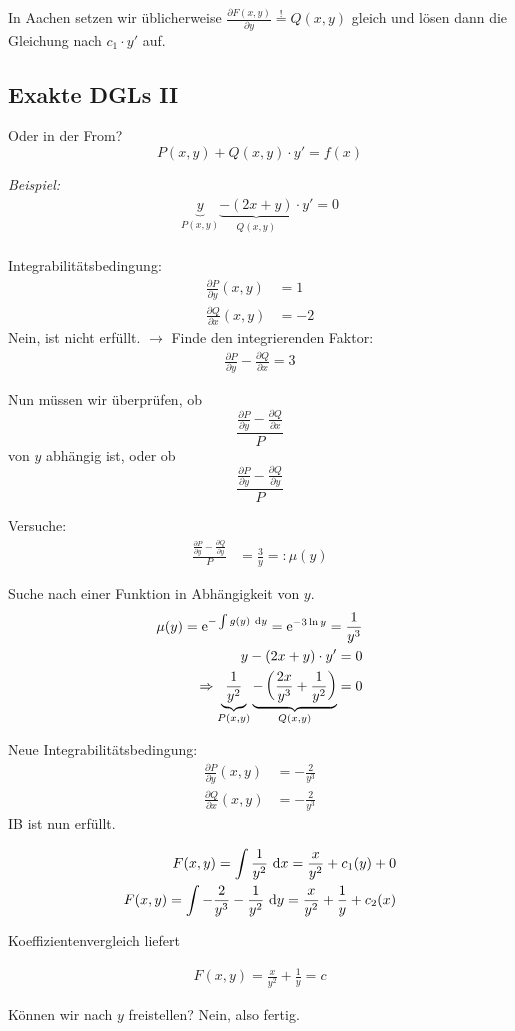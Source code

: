 \documentclass[main.tex]{subfiles}
\begin{document}
In Aachen setzen wir üblicherweise $\frac{\partial F(x,y)}{\partial y} \overset{!}{=} Q(x,y)$ gleich und lösen dann die Gleichung nach $c_1 \cdot y'$ auf.

\subsection{Exakte DGLs II} \label{exakte2}
Oder in der From? 
$$
	P(x,y) + Q(x,y)\cdot y' = f(x)
$$

\textit{Beispiel:}
\begin{align*}
	\underbrace{y}_{P(x,y)} \underbrace{- (2x +y)}_{Q(x,y)} \cdot y' = 0 \\
\end{align*}

Integrabilitätsbedingung:
\begin{align*}
	\frac{\partial P}{\partial y}(x,y) &= 1 \\
	\frac{\partial Q}{\partial x}(x,y) &= -2 
\end{align*}
Nein, ist nicht erfüllt. $\rightarrow$ Finde den integrierenden Faktor:
\begin{align*}
	\frac{\partial P}{\partial y} - \frac{\partial Q}{\partial x} = 3
\end{align*}

Nun müssen wir überprüfen, ob 
\[
	\frac{\frac{\partial P}{\partial y} - \frac{\partial Q}{\partial x}}{P} 
\]
von $y$ abhängig ist, oder ob 
\[
	\frac{\frac{\partial P}{\partial y} - \frac{\partial Q}{\partial y}}{P} 
\]


Versuche: 
\begin{align*}
	\frac{\frac{\partial P}{\partial y} - \frac{\partial Q}{\partial y}}{P} 
	&= \frac{3}{y} =: \mu(y)
\end{align*}

Suche nach einer Funktion in Abhängigkeit von $y$. 
\begin{align*}
	\mu(y) = \operatorname{\mathrm{e}}^{-\int g(y)~\mathrm{d}y} = \operatorname{\mathrm{e}}^{-3\ln y} = \frac{1}{y^3} \\
	y-(2x +y) \cdot y' = 0 \\
	\Rightarrow \underbrace{\frac{1}{y^2}}_{P(x,y)} \underbrace{ -\left(\frac{2x}{y^3} + \frac{1}{y^2} \right)}_{Q(x,y)} = 0
\end{align*}

Neue Integrabilitätsbedingung:
\begin{align*}
	\frac{\partial P}{\partial y}(x,y) &= - \frac{2}{y^3} \\
	\frac{\partial Q}{\partial x}(x,y) &= - \frac{2}{y^3} 
\end{align*}
IB ist nun erfüllt. 

\begin{align*}
	F(x,y) = \int \frac{1}{y^2} ~\mathrm{d}x = \frac{x}{y^2} + c_1(y) + 0\\
	F(x,y) = \int - \frac{2}{y^3} - \frac{1}{y^2} ~\mathrm{d}y = \frac{x}{y^2} + \frac{1}{y} + c_2(x)
\end{align*}

Koeffizientenvergleich liefert

\begin{align*}
	F(x,y) = \frac{x}{y^2} + \frac{1}{y} = c
\end{align*}

Können wir nach $y$ freistellen? Nein, also fertig. 
\end{document}
